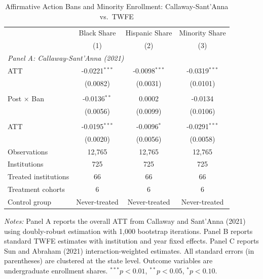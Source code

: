 \begin{table}[htbp]
\centering
\caption{Affirmative Action Bans and Minority Enrollment: Callaway-Sant'Anna vs.\ TWFE}
\label{tab:main}
\begin{tabular}{lccc}
\hline\hline
 & Black Share & Hispanic Share & Minority Share \\
 & (1) & (2) & (3) \\
\hline
\multicolumn{4}{l}{\textit{Panel A: Callaway-Sant'Anna (2021)}} \\
\addlinespace
ATT & -0.0221$^{***}$ & -0.0098$^{***}$ & -0.0319$^{***}$ \\
 & (0.0082) & (0.0031) & (0.0101) \\
\addlinespace
\multicolumn{4}{l}{\textit{Panel B: Two-Way Fixed Effects}} \\
\addlinespace
Post $\times$ Ban & -0.0136$^{**}$ & 0.0002 & -0.0134 \\
 & (0.0056) & (0.0099) & (0.0106) \\
\addlinespace
\multicolumn{4}{l}{\textit{Panel C: Sun-Abraham (2021)}} \\
\addlinespace
ATT & -0.0195$^{***}$ & -0.0096$^{*}$ & -0.0291$^{***}$ \\
 & (0.0020) & (0.0056) & (0.0058) \\
\addlinespace
\hline
Observations & 12,765 & 12,765 & 12,765 \\
Institutions & 725 & 725 & 725 \\
Treated institutions & 66 & 66 & 66 \\
Treatment cohorts & 6 & 6 & 6 \\
Control group & Never-treated & Never-treated & Never-treated \\
\hline\hline
\end{tabular}
\begin{tablenotes}
\item \textit{Notes:} Panel A reports the overall ATT from Callaway and Sant'Anna (2021) using doubly-robust estimation with 1,000 bootstrap iterations. Panel B reports standard TWFE estimates with institution and year fixed effects. Panel C reports Sun and Abraham (2021) interaction-weighted estimates. All standard errors (in parentheses) are clustered at the state level. Outcome variables are undergraduate enrollment shares. $^{***}p<0.01$, $^{**}p<0.05$, $^{*}p<0.10$.
\end{tablenotes}
\end{table}
